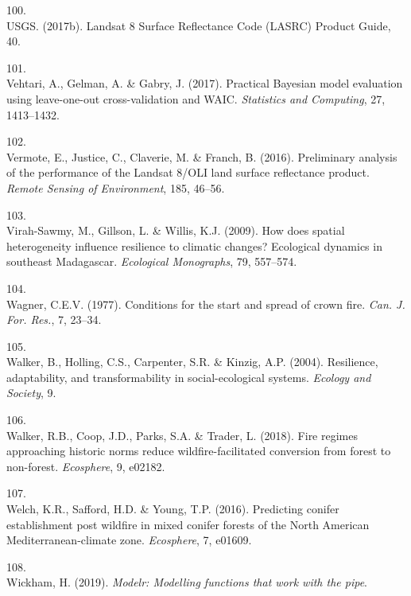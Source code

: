 \documentclass[]{article}
\begin{document}
\leavevmode\hypertarget{ref-usgs2017a}{}%
100.\\
USGS. (2017b). Landsat 8 Surface Reflectance Code (LASRC) Product Guide,
40.

\leavevmode\hypertarget{ref-vehtari2017}{}%
101.\\
Vehtari, A., Gelman, A. \& Gabry, J. (2017). Practical Bayesian model
evaluation using leave-one-out cross-validation and WAIC.
\emph{Statistics and Computing}, 27, 1413--1432.

\leavevmode\hypertarget{ref-vermote2016}{}%
102.\\
Vermote, E., Justice, C., Claverie, M. \& Franch, B. (2016). Preliminary
analysis of the performance of the Landsat 8/OLI land surface
reflectance product. \emph{Remote Sensing of Environment}, 185, 46--56.

\leavevmode\hypertarget{ref-virah-sawmy2009}{}%
103.\\
Virah-Sawmy, M., Gillson, L. \& Willis, K.J. (2009). How does spatial
heterogeneity influence resilience to climatic changes? Ecological
dynamics in southeast Madagascar. \emph{Ecological Monographs}, 79,
557--574.

\leavevmode\hypertarget{ref-wagner1977}{}%
104.\\
Wagner, C.E.V. (1977). Conditions for the start and spread of crown
fire. \emph{Can. J. For. Res.}, 7, 23--34.

\leavevmode\hypertarget{ref-walker2004}{}%
105.\\
Walker, B., Holling, C.S., Carpenter, S.R. \& Kinzig, A.P. (2004).
Resilience, adaptability, and transformability in social-ecological
systems. \emph{Ecology and Society}, 9.

\leavevmode\hypertarget{ref-walker2018}{}%
106.\\
Walker, R.B., Coop, J.D., Parks, S.A. \& Trader, L. (2018). Fire regimes
approaching historic norms reduce wildfire-facilitated conversion from
forest to non-forest. \emph{Ecosphere}, 9, e02182.

\leavevmode\hypertarget{ref-welch2016}{}%
107.\\
Welch, K.R., Safford, H.D. \& Young, T.P. (2016). Predicting conifer
establishment post wildfire in mixed conifer forests of the North
American Mediterranean-climate zone. \emph{Ecosphere}, 7, e01609.

\leavevmode\hypertarget{ref-wickham2019}{}%
108.\\
Wickham, H. (2019). \emph{Modelr: Modelling functions that work with the
pipe}.
\end{document}

